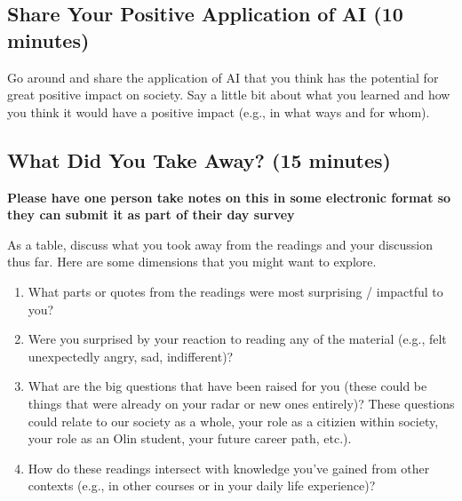 \subsection{Share Your Positive Application of AI (10 minutes)}
Go around and share the application of AI that you think has the potential for great positive impact on society. Say a little bit about what you learned and how you think it would have a positive impact (e.g., in what ways and for whom).

\subsection{What Did You Take Away? (15 minutes)}

\textbf{Please have one person take notes on this in some electronic format so they can submit it as part of their day survey}

As a table, discuss what you took away from the readings and your discussion thus far.  Here are some dimensions that you might want to explore.
\begin{enumerate}
\item What parts or quotes from the readings were most surprising / impactful to you?
\item Were you surprised by your reaction to reading any of the material (e.g., felt unexpectedly angry, sad, indifferent)?
\item What are the big questions that have been raised for you (these could be things that were already on your radar or new ones entirely)?  These questions could relate to our society as a whole, your role as a citizien within society, your role as an Olin student, your future career path, etc.).
\item How do these readings intersect with knowledge you've gained from other contexts (e.g., in other courses or in your daily life experience)?
\end{enumerate}

\pagebreak
\shipoutAnswer